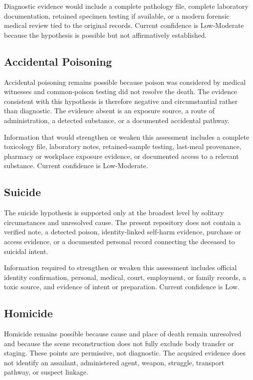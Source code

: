 Diagnostic evidence would include a complete pathology file, complete laboratory documentation, retained specimen testing if available, or a modern forensic medical review tied to the original records. Current confidence is Low-Moderate because the hypothesis is possible but not affirmatively established.

\subsection{Accidental Poisoning}

Accidental poisoning remains possible because poison was considered by medical witnesses and common-poison testing did not resolve the death. The evidence consistent with this hypothesis is therefore negative and circumstantial rather than diagnostic. The evidence absent is an exposure source, a route of administration, a detected substance, or a documented accidental pathway.

Information that would strengthen or weaken this assessment includes a complete toxicology file, laboratory notes, retained-sample testing, last-meal provenance, pharmacy or workplace exposure evidence, or documented access to a relevant substance. Current confidence is Low-Moderate.

\subsection{Suicide}

The suicide hypothesis is supported only at the broadest level by solitary circumstances and unresolved cause. The present repository does not contain a verified note, a detected poison, identity-linked self-harm evidence, purchase or access evidence, or a documented personal record connecting the deceased to suicidal intent.

Information required to strengthen or weaken this assessment includes official identity confirmation, personal, medical, court, employment, or family records, a toxic source, and evidence of intent or preparation. Current confidence is Low.

\subsection{Homicide}

Homicide remains possible because cause and place of death remain unresolved and because the scene reconstruction does not fully exclude body transfer or staging. These points are permissive, not diagnostic. The acquired evidence does not identify an assailant, administered agent, weapon, struggle, transport pathway, or suspect linkage.

